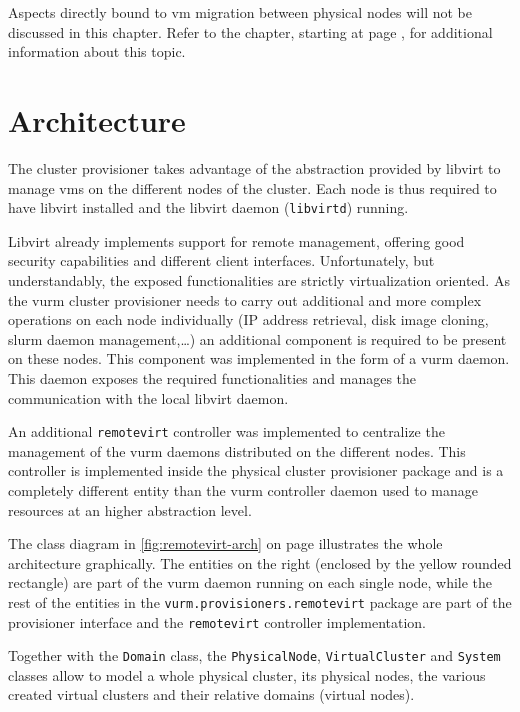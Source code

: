 Aspects directly bound to \gls{vm} migration between physical nodes will not be discussed in this chapter. Refer to the \emph{} chapter, starting at page \pageref{sec:migration}, for additional information about this topic.



\section{Architecture}
\label{sec:cluster-arch}

The cluster provisioner takes advantage of the abstraction provided by libvirt to manage \glspl{vm} on the different nodes of the cluster. Each node is thus required to have libvirt installed and the libvirt daemon (\texttt{libvirtd}) running.

Libvirt already implements support for remote management, offering good security capabilities and different client interfaces. Unfortunately, but understandably, the exposed functionalities are strictly virtualization oriented. As the \gls{vurm} cluster provisioner needs to carry out additional and more complex operations on each node individually (IP address retrieval, disk image cloning, \gls{slurm} daemon management,…) an additional component is required to be present on these nodes. This component was implemented in the form of a \gls{vurm} daemon. This daemon exposes the required functionalities and manages the communication with the local libvirt daemon.

An additional \texttt{remotevirt} controller was implemented to centralize the management of the \gls{vurm} daemons distributed on the different nodes. This controller is implemented inside the physical cluster provisioner package and is a completely different entity than the \gls{vurm} controller daemon used to manage resources at an higher abstraction level.

The class diagram in \autoref{fig:remotevirt-arch} on page \pageref{fig:remotevirt-arch} illustrates the whole architecture graphically. The entities on the right (enclosed by the yellow rounded rectangle) are part of the \gls{vurm} daemon running on each single node, while the rest of the entities in the \texttt{vurm.provisioners.remotevirt} package are part of the provisioner interface and the \texttt{remotevirt} controller implementation.

Together with the \texttt{Domain} class, the \texttt{PhysicalNode}, \texttt{VirtualCluster} and \texttt{System} classes allow to model a whole physical cluster, its physical nodes, the various created virtual clusters and their relative domains (virtual nodes).

